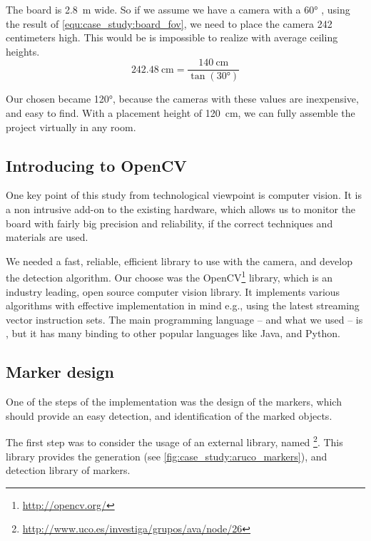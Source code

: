 \begin{example}
	The board is 2.8~\si{\meter} wide. So if we assume we have a camera with a \ang{60} , using the result of \cref{equ:case_study:board_fov}, we need to place the camera 242 centimeters high. This would be is impossible to realize with average ceiling heights.
	\begin{equation}
		\label{equ:case_study:board_fov}
		242.48~\si{\centi\meter} = \frac{140~\si{\centi\meter}}{\tan(\ang{30})}
	\end{equation}
\end{example}

Our chosen  became \ang{120}, because the cameras with these  values are inexpensive, and easy to find. With a placement height of 120~\si{\centi\meter}, we can fully assemble the project virtually in any room.

\subsection{Introducing to OpenCV}

One key point of this study from technological viewpoint is computer vision. It is a non intrusive add-on to the existing hardware, which allows us to monitor the board with fairly big precision and reliability, if the correct techniques and materials are used.

We needed a fast, reliable, efficient library to use with the camera, and develop the detection algorithm. Our choose was the OpenCV\footnote{\url{http://opencv.org/}} library, which is an industry leading, open source computer vision library. It implements various algorithms with effective implementation in mind e.g., using the latest streaming vector instruction sets. The main programming language -- and what we used -- is , but it has many binding to other popular languages like Java, and Python.

\subsection{Marker design}

One of the steps of the  implementation was the design of the markers, which should provide an easy detection, and identification of the marked objects.

The first step was to consider the usage of an external library, named \footnote{\url{http://www.uco.es/investiga/grupos/ava/node/26}}. This library provides the generation (see \cref{fig:case_study:aruco_markers}), and detection library of markers.

